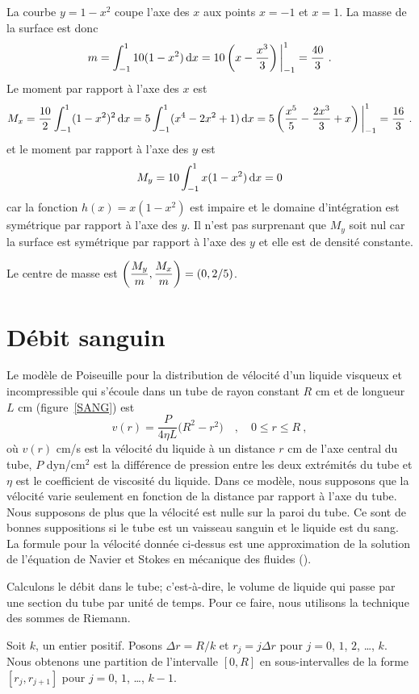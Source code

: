 {\begin{egg}
La courbe $y=1-x^2$ coupe l'axe des $x$ aux points $x=-1$ et $x=1$.
La masse de la surface est donc
\[
m = \int_{-1}^1 10(1-x^2) \,\mathrm{d}x = 10
\left( x - \frac{x^3}{3}\right)\bigg|_{-1}^1 = \frac{40}{3} \ .
\]
Le moment par rapport à l'axe des $x$ est
\[
M_x = \frac{10}{2}  \int_{-1}^1 (1-x^2)^2 \,\mathrm{d}x
= 5 \int_{-1}^1 (x^4 - 2x^2 + 1) \,\mathrm{d}x
= 5\left( \frac{x^5}{5} - \frac{2x^3}{3} + x \right)\bigg|_{-1}^1
= \frac{16}{3} \ .
\]
et le moment par rapport à l'axe des $y$ est
\[
M_y = 10 \int_{-1}^1 x(1-x^2) \,\mathrm{d}x = 0
\]
car la fonction $h(x) = x(1-x^2)$ est impaire et le domaine d'intégration
est symétrique par rapport à l'axe des $y$.  Il n'est pas surprenant que
$M_y$ soit nul car la surface est symétrique par rapport à l'axe des
$y$ et elle est de densité constante.

Le centre de masse est
$\displaystyle \left(\frac{M_y}{m},\frac{M_x}{m}\right) = (0, 2/5)$.
\end{egg}

\section{Débit sanguin \life}

Le modèle de Poiseuille pour la distribution de vélocité d'un liquide visqueux
et incompressible qui s'écoule dans un tube de rayon constant $R$ cm et de
longueur $L$ cm (figure~\ref{SANG}) est
\[
v(r) = \frac{P}{4\eta L}\big( R^2-r^2\big) \quad , \quad 0 \leq r \leq R \ ,
\]
où $v(r)$ cm/s est la vélocité du liquide à un distance $r$ cm de l'axe
central du tube, $P$ dyn/cm$^2$ est la différence de pression entre les
deux extrémités du tube et $\eta$ est le coefficient de viscosité du liquide.
Dans ce modèle, nous supposons que la vélocité varie seulement en fonction de la
distance par rapport à l'axe du tube.  Nous supposons de plus que la
vélocité est nulle sur la paroi du tube.  Ce sont de bonnes
suppositions si le tube est un vaisseau sanguin et le liquide est du
sang.  La formule pour la vélocité donnée ci-dessus est une
approximation de la solution de l'équation de Navier et Stokes en
mécanique des fluides (\cite{BE}).


Calculons le débit dans le tube; c'est-à-dire, le volume de liquide
qui passe par une section du tube par unité de temps.  Pour ce faire, nous
utilisons la technique des sommes de Riemann.

Soit $k$, un entier positif.  Posons $\Delta r = R/k$ et
$r_j = j \Delta r$ pour $j=0$, $1$, $2$, \ldots, $k$.  Nous obtenons une
partition de l'intervalle $[0,R]$ en sous-intervalles de la forme
$[r_j,r_{j+1}]$ pour $j=0$, $1$, \ldots, $k-1$.

}
